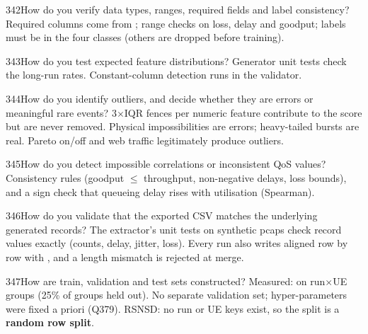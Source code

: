 \begin{qa}{342}{How do you verify data types, ranges, required fields and label consistency?}
Required columns come from ; range checks on loss, delay and goodput; labels must be in the four
classes (others are dropped before training).
\end{qa}

\begin{qa}{343}{How do you test expected feature distributions?}
Generator unit tests check the long-run rates. Constant-column detection runs in the validator.
\end{qa}

\begin{qa}{344}{How do you identify outliers, and decide whether they are errors or meaningful rare events?}
3$\times$IQR fences per numeric feature contribute to the score but are never removed. Physical impossibilities are
errors; heavy-tailed bursts are real. Pareto on/off and web traffic legitimately produce outliers.
\end{qa}

\begin{qa}{345}{How do you detect impossible correlations or inconsistent QoS values?}
Consistency rules (goodput $\le$ throughput, non-negative delays, loss bounds), and a sign check that queueing delay
rises with utilisation (Spearman).
\end{qa}

\begin{qa}{346}{How do you validate that the exported CSV matches the underlying generated records?}
The extractor's unit tests on synthetic pcaps check record values exactly (counts, delay, jitter, loss). Every run
also writes  aligned row by row with , and a length mismatch is rejected at merge.
\end{qa}

\begin{qa}{347}{How are train, validation and test sets constructed?}
Measured:  on run$\times$UE groups (25\% of groups held out). No separate validation set;
hyper-parameters were fixed a priori (Q379).
RSNSD: no run or UE keys exist, so the split is a \textbf{random row split}.
\end{qa}

